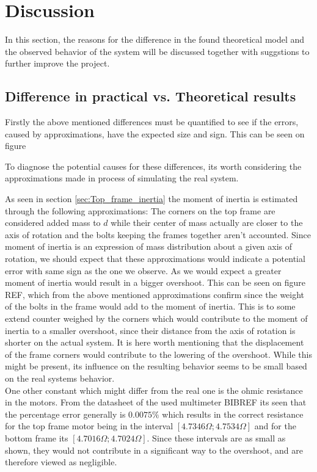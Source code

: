 \documentclass[../../main]{subfiles}
\begin{document}
\section{Discussion}
\label{sec:discussion}
In this section, the reasons for the difference in the found theoretical model and the observed behavior of the system will be discussed together with suggstions to further improve the project.

\subsection{Difference in practical vs. Theoretical results}
Firstly the above mentioned differences must be quantified to see if the errors, caused by approximations, have the expected size and sign. This can be seen on figure 


To diagnose the potential causes for these differences, its worth considering the approximations made in process of simulating the real system.


As seen in section \ref{sec:Top_frame_inertia} the moment of inertia is estimated through the following approximations: The corners on the top frame are considered added mass to $d$ while their center of mass actually are closer to the axis of rotation and the bolts keeping the frames together aren't accounted. Since moment of inertia is an expression of mass distribution about a given axis of rotation, we should expect that these approximations would indicate a potential error with same sign as the one we observe. As we would expect a greater moment of inertia would result in a bigger overshoot. This can be seen on figure REF, which from the above mentioned approximations confirm since the weight of the bolts in the frame would add to the moment of inertia. This is to some extend counter weighed by the corners which would contribute to the moment of inertia to a smaller overshoot, since their distance from the axis of rotation is shorter on the actual system. It is here worth mentioning that the displacement of the frame corners would contribute to the lowering of the overshoot. While this might be present, its influence on the resulting behavior seems to be small based on the real systems behavior.\\
One other constant which might differ from the real one is the ohmic resistance in the motors. From the datasheet of the used multimeter BIBREF its seen that the percentage error generally is $0.0075\%$ which results in the correct resistance for the top frame motor being in the interval $[4.7346\Omega;4.7534\Omega]$ and for the bottom frame its $[4.7016\Omega;4.7024\Omega]$. Since these intervals are as small as shown, they would not contribute in a significant way to the overshoot, and are therefore viewed as negligible.\\
\end{document}
